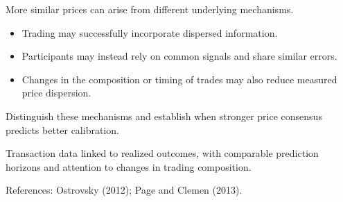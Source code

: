 \begin{frame}[t]
\par{}
\begin{pmbody}
{\color{pmGrey}\fontsize{20}{27}\selectfont More similar prices can arise from different underlying mechanisms.\par}
\begin{itemize}\pmspreaditems
  \item Trading may successfully incorporate dispersed information.
  \item Participants may instead rely on common signals and share similar errors.
  \item Changes in the composition or timing of trades may also reduce measured price dispersion.
\end{itemize}
\begin{pmcallout}
  Distinguish these mechanisms and establish when stronger price consensus predicts better calibration.
\end{pmcallout}
\begin{pmcallout}
  Transaction data linked to realized outcomes, with comparable prediction horizons and attention to changes in trading composition.
\end{pmcallout}
{\color{pmGrey}\fontsize{11}{14}\selectfont References: Ostrovsky (2012); Page and Clemen (2013).\par}
\end{pmbody}
\end{frame}
